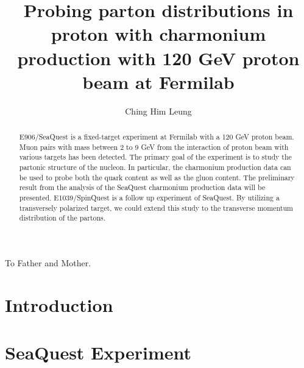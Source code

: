 \documentclass{uiucthesis2021}
\begin{document}
\title{Probing parton distributions in proton with charmonium production with
	120 GeV proton beam at Fermilab}
\author{Ching Him Leung}
\phdthesis
{}
\maketitle

\frontmatter

\begin{abstract}
E906/SeaQuest is a fixed-target experiment at Fermilab with a 120 GeV proton 
beam. Muon pairs with mass between 2 to 9 GeV from the interaction of 
proton beam with various targets has been detected. The primary goal of the 
experiment is to study the partonic structure of the nucleon. In particular, 
the charmonium production data can be used to probe both the quark content as 
well as the gluon content. The preliminary result from the analysis of the 
SeaQuest charmonium production data will be presented.  E1039/SpinQuest is a 
follow up experiment of SeaQuest. By utilizing a transversely polarized target,
we could extend this study to the transverse momentum distribution of the 
partons. 
\end{abstract}

\begin{dedication}
To Father and Mother.
\end{dedication}



{
	\hypersetup{linkcolor=black}  %
	\tableofcontents
	\listoffigures
}


\mainmatter

\chapter{Introduction}


\chapter{SeaQuest Experiment}

\end{document}
